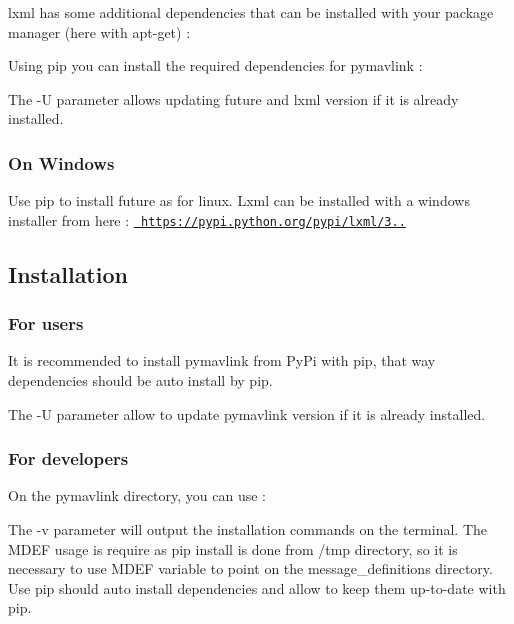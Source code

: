 lxml has some additional dependencies that can be installed with your package manager (here with apt-\/get) \+:


\begin{DoxyCode}{0}
\end{DoxyCode}


Using pip you can install the required dependencies for pymavlink \+:


\begin{DoxyCode}{0}
\end{DoxyCode}


The -\/U parameter allows updating future and lxml version if it is already installed.

\subsubsection*{On Windows}

Use pip to install future as for linux. Lxml can be installed with a windows installer from here \+: \href{https://pypi.python.org/pypi/lxml/3.6.0}{\texttt{ https\+://pypi.\+python.\+org/pypi/lxml/3..}}

\subsection*{Installation}

\subsubsection*{For users}

It is recommended to install pymavlink from Py\+Pi with pip, that way dependencies should be auto install by pip. 
\begin{DoxyCode}{0}
\end{DoxyCode}
 The -\/U parameter allow to update pymavlink version if it is already installed.

\subsubsection*{For developers}

On the pymavlink directory, you can use \+: 
\begin{DoxyCode}{0}
\end{DoxyCode}
 The -\/v parameter will output the installation commands on the terminal. The M\+D\+EF usage is require as pip install is done from /tmp directory, so it is necessary to use M\+D\+EF variable to point on the message\+\_\+definitions directory. Use pip should auto install dependencies and allow to keep them up-\/to-\/date with pip.

